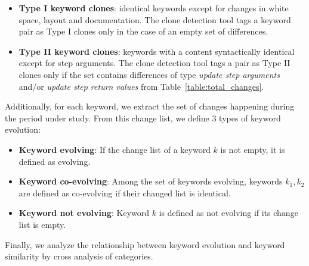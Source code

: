 \begin{itemize}
    \item \textbf{Type I keyword clones}: identical keywords except for changes in white space, layout and documentation. The clone detection tool tags a keyword pair as Type I clones only in the case of an empty set of differences.
  
    \item \textbf{Type II keyword clones}: keywords with a content syntactically  identical except for step arguments. The clone detection tool tags a pair as Type II clones only if the set contains differences of type \emph{update step arguments} and/or \emph{update step return values} from Table~\ref{table:total_changes}.
\end{itemize}

 Additionally, for each keyword, we extract the set of changes happening during the period under study. From this change list, we define 3 types of keyword evolution:
 
 \begin{itemize}
   \item \textbf{Keyword evolving}: If the change list of a keyword $k$ is not empty, it is defined as evolving.
   
   \item \textbf{Keyword co-evolving}: Among the set of keywords evolving, keywords $k_1, k_2$ are defined as co-evolving if their changed list is identical.
   
   \item \textbf{Keyword not evolving}: Keyword $k$ is defined as not evolving if its change list is empty. 
 \end{itemize}

 Finally, we analyze the relationship between keyword evolution and keyword similarity by cross analysis of categories.